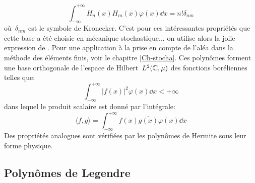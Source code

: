 \begin{equation}
  \int_{-\infty}^{+\infty} H_n(x)H_m(x)\varphi(x)\dd x=n!\delta_{nm} 
\end{equation}
où~$\delta_{nm}$ est le symbole de Kronecker. C'est pour ces intéressantes propriétés que cette base a été choisie en mécanique stochastique... on utilise alors la jolie expression de . 
Pour une application à la prise en compte de l'aléa dans la méthode des éléments finis, voir le chapitre \ref{Ch-stocha}.
Ces polynômes forment une base orthogonale de l'espace de Hilbert~$L^2(\mathbb C,\mu)$ des fonctions boréliennes telles que: 
\begin{equation}
\int_{-\infty}^{+\infty}|f(x)|^2\varphi(x)\dd x< +\infty
\end{equation}
dans lequel le produit scalaire est donné par l'intégrale: 
\begin{equation}
\langle f,g\rangle=\int_{-\infty}^{+\infty} f(x)\overline{g(x)}\varphi(x)\dd x
\end{equation}
Des propriétés analogues sont vérifiées par les polynômes de Hermite sous leur forme physique. 

\medskip
\subsection{Polynômes de Legendre} 

